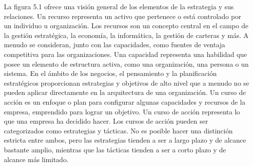 La figura 5.1 ofrece una visión general de los elementos de la estrategia y sus relaciones. Un recurso representa un activo que pertenece o está controlado por un individuo u organización.
Los recursos son un concepto central en el campo de la gestión estratégica, la economía, la informática, la gestión de carteras y más. A menudo se consideran, junto con las capacidades, como fuentes de ventaja competitiva para las organizaciones. Una capacidad representa una habilidad que posee un elemento de estructura activa, como una organización, una persona o un sistema.
En el ámbito de los negocios, el pensamiento y la planificación estratégicos proporcionan estrategias y objetivos de alto nivel que a menudo no se pueden aplicar directamente en la arquitectura de una organización. Un curso de acción es un enfoque o plan para configurar algunas capacidades y recursos de la empresa, emprendido para lograr un objetivo. Un curso de acción representa lo que una empresa ha decidido hacer. Los cursos de acción pueden ser categorizados como estrategias y tácticas. No es posible hacer una distinción estricta entre ambos, pero las estrategias tienden a ser a largo plazo y de alcance bastante amplio, mientras que las tácticas tienden a ser a corto plazo y de alcance más limitado.

\newpage


\newpage



\newpage


\newpage


